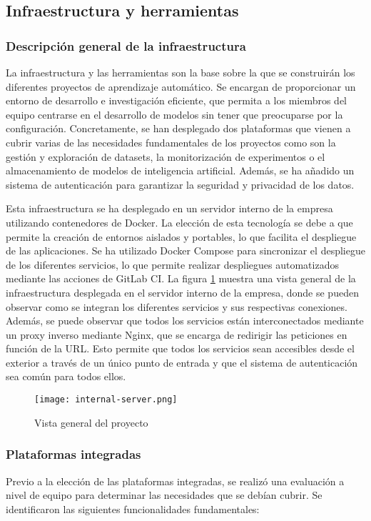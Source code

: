 \subsection{Infraestructura y herramientas}
\subsubsection{Descripción general de la infraestructura}
La infraestructura y las herramientas son la base sobre la que se construirán
los diferentes proyectos de aprendizaje automático. Se encargan de proporcionar
un entorno de desarrollo e investigación eficiente, que permita a los miembros
del equipo centrarse en el desarrollo de modelos sin tener que preocuparse por
la configuración. Concretamente, se han desplegado dos plataformas 
que vienen a cubrir varias de las necesidades fundamentales de los proyectos
como son la gestión y exploración de datasets, la monitorización de experimentos o
el almacenamiento de modelos de inteligencia artificial. Además, se ha añadido un sistema de autenticación 
para garantizar la seguridad y privacidad de los datos.\medskip

Esta infraestructura se ha desplegado en un servidor interno de la empresa
utilizando contenedores de Docker. La elección de esta tecnología se debe a
que permite la creación de entornos aislados y portables, lo que facilita el
despliegue de las aplicaciones. Se ha utilizado Docker Compose para
sincronizar el despliegue de los diferentes servicios, lo que permite
realizar despliegues automatizados mediante las acciones de GitLab CI. La
figura \ref{fig:internal-server} muestra una vista general de la infraestructura
desplegada en el servidor interno de la empresa, donde se pueden observar
como se integran los diferentes servicios y sus respectivas conexiones. Además,
se puede observar que todos los servicios están interconectados mediante un
proxy inverso mediante Nginx, que se encarga de redirigir las peticiones en 
función de la URL. Esto permite que todos los servicios sean
accesibles desde el exterior a través de un único punto de entrada y que el
sistema de autenticación sea común para todos ellos.

\begin{figure}[ht]
    \centering
    \texttt{[image: internal-server.png]}
    \caption{Vista general del proyecto}\label{fig:internal-server}
\end{figure}

\subsubsection{Plataformas integradas}
Previo a la elección de las plataformas integradas, se realizó una evaluación
a nivel de equipo para determinar las necesidades que se debían cubrir. Se
identificaron las siguientes funcionalidades fundamentales:

